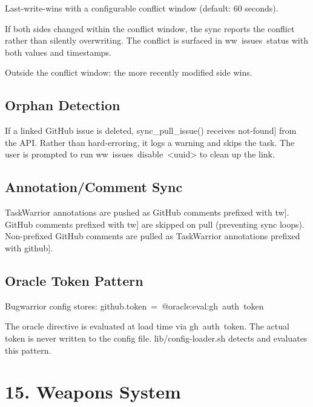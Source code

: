 \documentclass[11pt, a4paper, DIV=14]{scrartcl}
\renewcommand{\texttt}[1]{{\ttfamily\fontsize{8.5}{10.5}\selectfont\color{BabbNavy}#1}}
\let\origRule\rule
\renewcommand{\rule}[2]{\par\vspace{2pt}\noindent{\color{BabbBorder}\origRule[0pt]{#1}{#2}}\par\vspace{2pt}}
\begin{document}
Last-write-wins with a configurable conflict window (default: 60
seconds).

If both sides changed within the conflict window, the sync reports the
conflict rather than silently overwriting. The conflict is surfaced in
\texttt{ww\ issues\ status} with both values and timestamps.

Outside the conflict window: the more recently modified side wins.

\subsection{Orphan Detection}\label{orphan-detection}

If a linked GitHub issue is deleted, \texttt{sync\_pull\_issue()}
receives \texttt{{[}not-found{]}} from the API. Rather than
hard-erroring, it logs a warning and skips the task. The user is
prompted to run
\texttt{ww\ issues\ disable\ \textless{}uuid\textgreater{}} to clean up
the link.

\subsection{Annotation/Comment Sync}\label{annotationcomment-sync}

TaskWarrior annotations are pushed as GitHub comments prefixed with
\texttt{{[}tw{]}}. GitHub comments prefixed with \texttt{{[}tw{]}} are
skipped on pull (preventing sync loops). Non-prefixed GitHub comments
are pulled as TaskWarrior annotations prefixed with
\texttt{{[}github{]}}.

\subsection{Oracle Token Pattern}\label{oracle-token-pattern}

Bugwarrior config stores:
\texttt{github.token\ =\ @oracle:eval:gh\ auth\ token}

The oracle directive is evaluated at load time via
\texttt{gh\ auth\ token}. The actual token is never written to the
config file. \texttt{lib/config-loader.sh} detects and evaluates this
pattern.

\begin{center}\rule{0.5\linewidth}{0.5pt}\end{center}

\section{15. Weapons System}\label{weapons-system}
\end{document}
